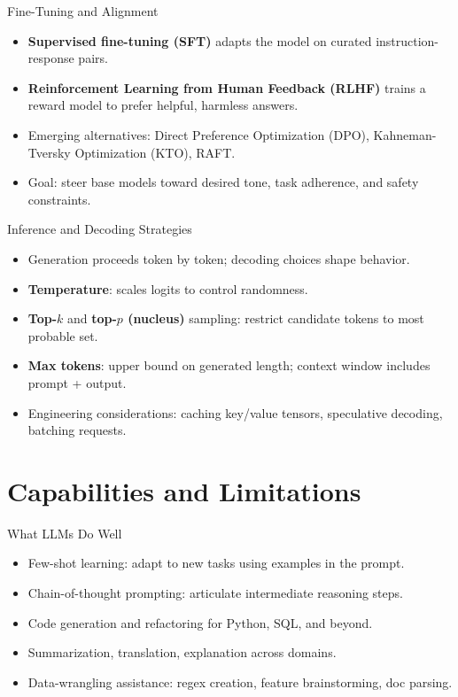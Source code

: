 \documentclass[aspectratio=169]{beamer}
\begin{document}
\begin{frame}{Fine-Tuning and Alignment}
  \begin{itemize}
    \item \textbf{Supervised fine-tuning (SFT)} adapts the model on curated instruction-response pairs.
    \item \textbf{Reinforcement Learning from Human Feedback (RLHF)} trains a reward model to prefer helpful, harmless answers.
    \item Emerging alternatives: Direct Preference Optimization (DPO), Kahneman-Tversky Optimization (KTO), RAFT.
    \item Goal: steer base models toward desired tone, task adherence, and safety constraints.
  \end{itemize}
\end{frame}

\begin{frame}{Inference and Decoding Strategies}
  \begin{itemize}
    \item Generation proceeds token by token; decoding choices shape behavior.
    \item \textbf{Temperature}: scales logits to control randomness.
    \item \textbf{Top-$k$} and \textbf{top-$p$ (nucleus)} sampling: restrict candidate tokens to most probable set.
    \item \textbf{Max tokens}: upper bound on generated length; context window includes prompt + output.
    \item Engineering considerations: caching key/value tensors, speculative decoding, batching requests.
  \end{itemize}
\end{frame}

\section{Capabilities and Limitations}

\begin{frame}{What LLMs Do Well}
  \begin{itemize}
    \item Few-shot learning: adapt to new tasks using examples in the prompt.
    \item Chain-of-thought prompting: articulate intermediate reasoning steps.
    \item Code generation and refactoring for Python, SQL, and beyond.
    \item Summarization, translation, explanation across domains.
    \item Data-wrangling assistance: regex creation, feature brainstorming, doc parsing.
  \end{itemize}
\end{frame}
\end{document}
